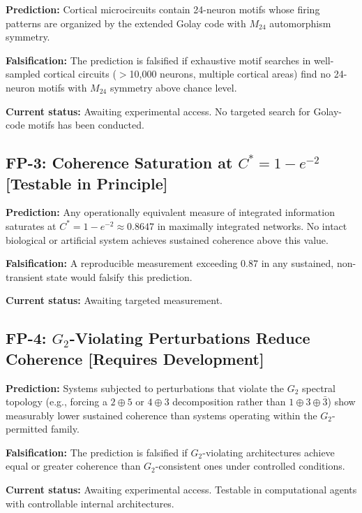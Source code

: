\documentclass[12pt,a4paper]{article}
\begin{document}
\textbf{Prediction:} Cortical microcircuits contain 24-neuron motifs whose firing patterns are organized by the extended Golay code with $M_{24}$ automorphism symmetry.

\textbf{Falsification:} The prediction is falsified if exhaustive motif searches in well-sampled cortical circuits ($>$10,000 neurons, multiple cortical areas) find no 24-neuron motifs with $M_{24}$ symmetry above chance level.

\textbf{Current status:} Awaiting experimental access. No targeted search for Golay-code motifs has been conducted.

\subsection{FP-3: Coherence Saturation at $C^* = 1 - e^{-2}$ [Testable in Principle]}

\textbf{Prediction:} Any operationally equivalent measure of integrated information saturates at $C^* = 1 - e^{-2} \approx 0.8647$ in maximally integrated networks. No intact biological or artificial system achieves sustained coherence above this value.

\textbf{Falsification:} A reproducible measurement exceeding 0.87 in any sustained, non-transient state would falsify this prediction.

\textbf{Current status:} Awaiting targeted measurement.

\subsection{FP-4: $G_2$-Violating Perturbations Reduce Coherence [Requires Development]}

\textbf{Prediction:} Systems subjected to perturbations that violate the $G_2$ spectral topology (e.g., forcing a $2 \oplus 5$ or $4 \oplus 3$ decomposition rather than $1 \oplus 3 \oplus \bar{3}$) show measurably lower sustained coherence than systems operating within the $G_2$-permitted family.

\textbf{Falsification:} The prediction is falsified if $G_2$-violating architectures achieve equal or greater coherence than $G_2$-consistent ones under controlled conditions.

\textbf{Current status:} Awaiting experimental access. Testable in computational agents with controllable internal architectures.
\end{document}
